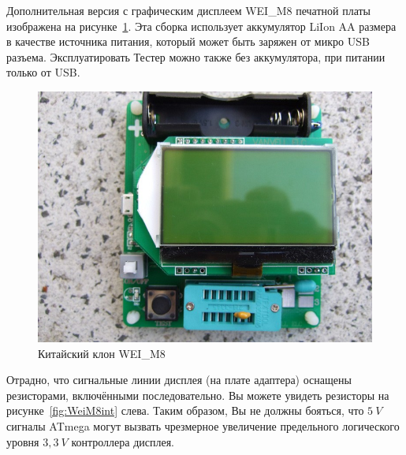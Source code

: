 Дополнительная версия с графическим дисплеем WEI\_M8 печатной платы изображена на рисунке~\ref{fig:WeiM8}. 
Эта сборка использует аккумулятор LiIon AA размера в качестве источника питания, который может быть 
заряжен от микро USB разъема. 
Эксплуатировать Тестер можно также без аккумулятора, при питании только от USB.
\begin{figure}[H]
\centering
\includegraphics[width=.7\textwidth]{../PNG/WEI_M8.JPG}
\caption{Китайский клон WEI\_M8}
\label{fig:WeiM8}
\end{figure}
Отрадно, что сигнальные линии дисплея (на плате адаптера) оснащены резисторами, включёнными 
последовательно. Вы можете увидеть резисторы на рисунке~\ref{fig:WeiM8int} слева.
Таким образом, Вы не должны бояться, что \(5~V\) сигналы ATmega могут вызвать чрезмерное 
увеличение предельного логического уровня \(3,3~V\) контроллера дисплея.
